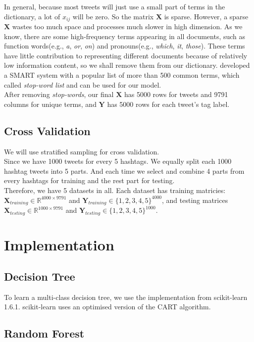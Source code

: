 \documentclass[letterpaper,11pt,twocolumn]{article}
\def\bfY{\mathbf Y}
\def\bfX{\mathbf X}
\def\R{\mathbb R}
\begin{document}
In general, because most tweets will just use a small part of terms in the dictionary, a lot of $x_{ij}$ will be zero. So the matrix $\bfX$ is sparse. However, a sparse $\bfX$ wastes too much space and processes much slower in high dimension. As we know, there are some high-frequency terms appearing in all documents, such as function words(e.g., \emph{a}, \emph{or}, \emph{on}) and pronouns(e.g., \emph{which}, \emph{it}, \emph{those}). These terms have little contribution to representing different documents because of relatively low information content, so we shall remove them from our dictionary. \cite{salton1971smart} developed a SMART system with a popular list of more than 500 common terms, which called \emph{stop-word list} and can be used for our model.\\
After removing \emph{stop-words}, our final $\bfX$ has 5000 rows for tweets and 9791 columns for unique terms, and $\bfY$ has 5000 rows for each tweet's tag label.
\subsection{Cross Validation}
We will use stratified sampling for cross validation.\\
Since we have 1000 tweets for every 5 hashtags. We equally split each 1000 hashtag tweets into 5 parts. And each time we select and combine 4 parts from every hashtags for training and the rest part for testing.\\
Therefore, we have 5 datasets in all. Each dataset has training matricies: $\bfX_{training} \in \R^{4000 \times 9791}$ and $\bfY_{training} \in \{1, 2, 3, 4, 5\}^{4000}$, and testing matrices $\bfX_{testing} \in \R^{1000 \times 9791}$ and $\bfY_{testing} \in \{1, 2, 3, 4, 5\}^{1000}$.

\section{Implementation}
\label{sec:impl}
\subsection{Decision Tree}
To learn a multi-class decision tree, we use the implementation from scikit-learn 1.6.1. scikit-learn uses an optimised version of the CART algorithm.\\
\subsection{Random Forest}
\end{document}
